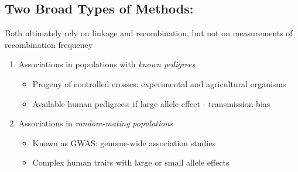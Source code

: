 \documentclass[10pt]{article}
\begin{document}
\subsection*{Two Broad Types of Methods:}
Both ultimately rely on linkage and recombination, but not on measurements of recombination frequency
\begin{enumerate}
	\item Associations in populations with \textit{known pedigrees}
	\begin{itemize}
	    \item Progeny of controlled crosses: experimental and agricultural organisms
	    \item Available human pedigrees: if large allele effect - transmission bias
    \end{itemize}
	\item Associations in \textit{random-mating populations}
	\begin{itemize}
	    \item Known as GWAS: genome-wide association studies
	    \item Complex human traits with large or small allele effects
    \end{itemize}
\end{enumerate}
\end{document}
